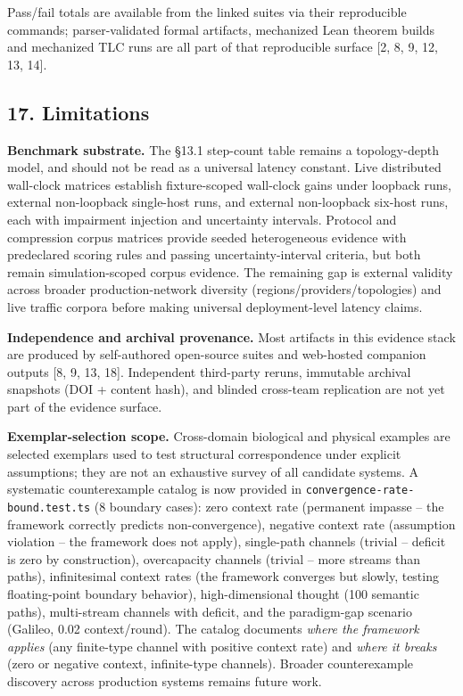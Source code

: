 \documentclass[
  11pt,
]{article}
\begin{document}
Pass/fail totals are available from the linked suites via their
reproducible commands; parser-validated formal artifacts, mechanized
Lean theorem builds and mechanized TLC runs are all part of that
reproducible surface {[}2, 8, 9, 12, 13, 14{]}.

\subsection{17. Limitations}\label{limitations}

\textbf{Benchmark substrate.} The §13.1 step-count table remains a
topology-depth model, and should not be read as a universal latency
constant. Live distributed wall-clock matrices establish fixture-scoped
wall-clock gains under loopback runs, external non-loopback single-host
runs, and external non-loopback six-host runs, each with impairment
injection and uncertainty intervals. Protocol and compression corpus
matrices provide seeded heterogeneous evidence with predeclared scoring
rules and passing uncertainty-interval criteria, but both remain
simulation-scoped corpus evidence. The remaining gap is external
validity across broader production-network diversity
(regions/providers/topologies) and live traffic corpora before making
universal deployment-level latency claims.

\textbf{Independence and archival provenance.} Most artifacts in this
evidence stack are produced by self-authored open-source suites and
web-hosted companion outputs {[}8, 9, 13, 18{]}. Independent third-party
reruns, immutable archival snapshots (DOI + content hash), and blinded
cross-team replication are not yet part of the evidence surface.

\textbf{Exemplar-selection scope.} Cross-domain biological and physical
examples are selected exemplars used to test structural correspondence
under explicit assumptions; they are not an exhaustive survey of all
candidate systems. A systematic counterexample catalog is now provided
in \texttt{convergence-rate-bound.test.ts} (8 boundary cases): zero
context rate (permanent impasse -- the framework correctly predicts
non-convergence), negative context rate (assumption violation -- the
framework does not apply), single-path channels (trivial -- deficit is
zero by construction), overcapacity channels (trivial -- more streams
than paths), infinitesimal context rates (the framework converges but
slowly, testing floating-point boundary behavior), high-dimensional
thought (100 semantic paths), multi-stream channels with deficit, and
the paradigm-gap scenario (Galileo, 0.02 context/round). The catalog
documents \emph{where the framework applies} (any finite-type channel
with positive context rate) and \emph{where it breaks} (zero or negative
context, infinite-type channels). Broader counterexample discovery
across production systems remains future work.
\end{document}
